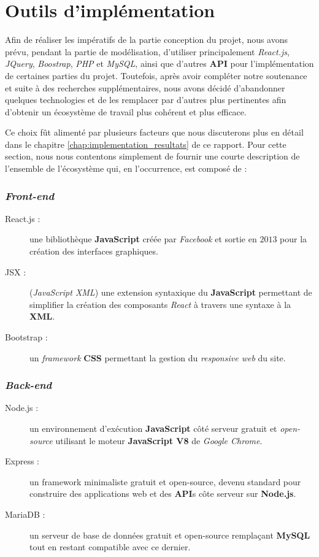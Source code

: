 \documentclass[a4paper,12pt]{report}
\theoremstyle{break}
\theoremstyle{break}
\theoremstyle{break}
\theoremstyle{break}
\theoremstyle{definition}
\theoremstyle{remark}
\begin{document}
\section{Outils d'implémentation}
Afin de réaliser les impératifs de la partie conception du projet, nous avons prévu, pendant la partie de modélisation, d'utiliser principalement \textit{React.js}, \textit{JQuery}, \textit{Boostrap}, \textit{PHP} et \textit{MySQL}, ainsi que d'autres \textbf{API} pour l'implémentation de certaines parties du projet. Toutefois, après avoir compléter notre soutenance et suite à des recherches supplémentaires, nous avons décidé d'abandonner quelques technologies et de les remplacer par d'autres plus pertinentes afin d'obtenir un écosystème de travail plus cohérent et plus efficace.

Ce choix fût alimenté par plusieurs facteurs que nous discuterons plus en détail dans le chapitre \ref{chap:implementation_resultats} de ce rapport. Pour cette section, nous nous contentons simplement de fournir une courte description de l'ensemble de l'écosystème qui, en l'occurrence, est composé de :

\subsubsection{\textit{Front-end}}
\begin{description}
  \item [React.js :] une bibliothèque \textbf{JavaScript} créée par \textit{Facebook} et sortie en $2013$ pour la création des interfaces graphiques.
  \item [JSX :] (\textit{JavaScript XML}) une extension syntaxique du \textbf{JavaScript} permettant de simplifier la création des composants \textit{React} à travers une syntaxe à la \textbf{XML}.
  \item [Bootstrap :] un \textit{framework} \textbf{CSS} permettant la gestion du \textit{responsive web} du site.
\end{description}

\subsubsection{\textit{Back-end}}
\begin{description}
  \item [Node.js :] un environnement d'exécution \textbf{JavaScript} côté serveur gratuit et \textit{open-source} utilisant le moteur \textbf{JavaScript V8} de \textit{Google Chrome}.
  \item [Express :] un framework minimaliste gratuit et open-source, devenu standard pour construire des applications web et des \textbf{API}s côte serveur sur \textbf{Node.js}.
  \item [MariaDB :] un serveur de base de données gratuit et open-source remplaçant \textbf{MySQL} tout en restant compatible avec ce dernier.
\end{description}
\end{document}
